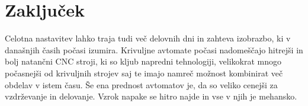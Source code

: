 \newpage
\section{Zaključek}
Celotna nastavitev lahko traja tudi več delovnih dni in zahteva
izobrazbo, ki v današnjih časih počasi izumira. Krivuljne avtomate
počasi nadomeščajo hitrejši in bolj natančni CNC stroji, ki so kljub
napredni tehnologiji, velikokrat mnogo počasnejši od krivuljnih strojev saj te
imajo namreč možnost kombinirat več obdelav v istem času. Še ena prednost avtomatov je, da so veliko cenejši
za vzdrževanje in delovanje. Vzrok napake se hitro najde in vse v njih je
mehansko.